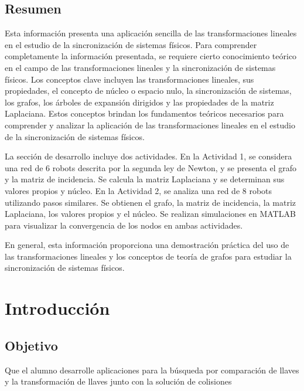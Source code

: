 \documentclass{report}
\begin{document}
  

 


  \begin{abstract}

  \end{abstract}
    

 
  \section*{Resumen}
    Esta información presenta una aplicación sencilla de las transformaciones lineales en el estudio de la sincronización de sistemas físicos. Para comprender completamente la información presentada, se requiere cierto conocimiento teórico en el campo de las transformaciones lineales y la sincronización de sistemas físicos. Los conceptos clave incluyen las transformaciones lineales, sus propiedades, el concepto de núcleo o espacio nulo, la sincronización de sistemas, los grafos, los árboles de expansión dirigidos y las propiedades de la matriz Laplaciana. Estos conceptos brindan los fundamentos teóricos necesarios para comprender y analizar la aplicación de las transformaciones lineales en el estudio de la sincronización de sistemas físicos.

La sección de desarrollo incluye dos actividades. En la Actividad 1, se considera una red de 6 robots descrita por la segunda ley de Newton, y se presenta el grafo y la matriz de incidencia. Se calcula la matriz Laplaciana y se determinan sus valores propios y núcleo. En la Actividad 2, se analiza una red de 8 robots utilizando pasos similares. Se obtienen el grafo, la matriz de incidencia, la matriz Laplaciana, los valores propios y el núcleo. Se realizan simulaciones en MATLAB para visualizar la convergencia de los nodos en ambas actividades.

En general, esta información proporciona una demostración práctica del uso de las transformaciones lineales y los conceptos de teoría de grafos para estudiar la sincronización de sistemas físicos.



\tableofcontents

  

\chapter{Introducción} 
    \section*{Objetivo}
    Que el alumno desarrolle aplicaciones para la búsqueda por comparación de llaves y la
    transformación de llaves junto con la solución de colisiones
\end{document}
